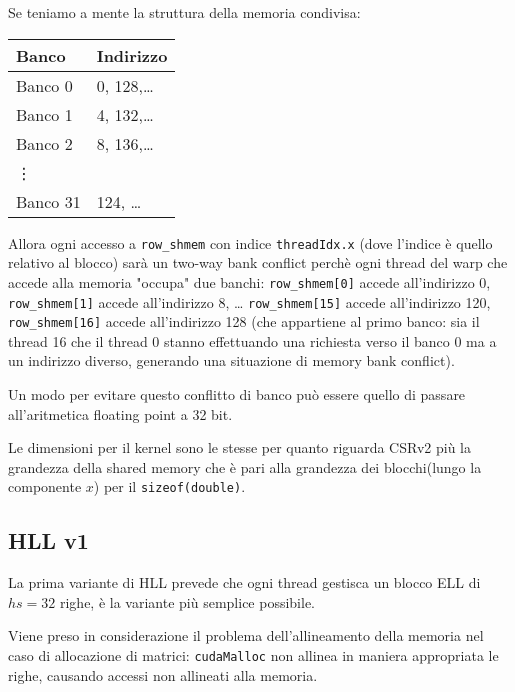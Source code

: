\documentclass[a4paper,9pt]{extarticle}
\begin{document}
Se teniamo a mente la struttura della memoria condivisa:
\vspace{\baselineskip}

\begin{minipage}{\linewidth}
\centering
\begin{tabular}{|l l|}
\hline
\textbf{Banco} & \textbf{Indirizzo} \\
\hline
\hline
Banco 0 & 0, 128,\dots \\
Banco 1 & 4, 132,\dots \\
Banco 2 & 8, 136,\dots \\
\hline
\vdots & \\
\hline
Banco 31 & 124, \dots \\
\hline
\end{tabular}
\end{minipage}

\vspace{\baselineskip}

Allora ogni accesso a \texttt{row\_shmem} con indice \texttt{threadIdx.x} (dove l'indice è quello relativo al blocco) sarà 
un two-way bank conflict perchè ogni thread del warp che accede alla memoria "occupa" due banchi:
\texttt{row\_shmem[0]} accede all'indirizzo 0, \texttt{row\_shmem[1]} accede all'indirizzo 8, \dots
\texttt{row\_shmem[15]} accede all'indirizzo 120, \texttt{row\_shmem[16]} accede all'indirizzo 128 (che appartiene al
primo banco: sia il thread 16 che il thread 0 stanno effettuando una richiesta verso il banco 0 ma a un indirizzo 
diverso, generando una situazione di memory bank conflict).

Un modo per evitare questo conflitto di banco può essere quello di passare all'aritmetica floating point a 32 bit.

Le dimensioni per il kernel sono le stesse per quanto riguarda CSRv2 più la grandezza della shared memory che è pari
alla grandezza dei blocchi(lungo la componente $x$) per il \texttt{sizeof(double)}.

\subsection{HLL v1}
La prima variante di HLL prevede che ogni thread gestisca un blocco ELL di $hs=32$ righe, è la variante più semplice
possibile.

Viene preso in considerazione il problema dell'allineamento della memoria nel caso di allocazione di matrici:
\texttt{cudaMalloc} non allinea in maniera appropriata le righe, causando accessi non allineati alla memoria.
\end{document}
